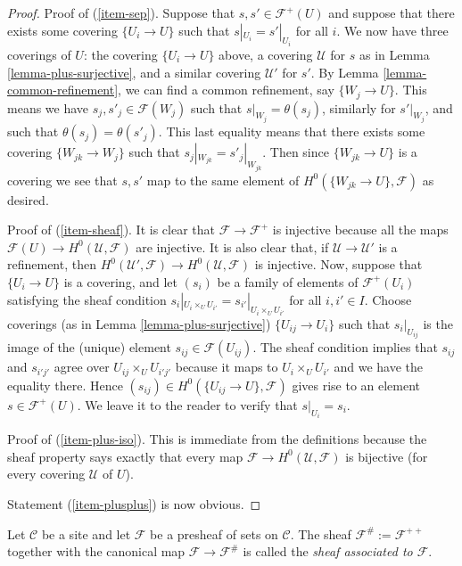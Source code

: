 \begin{proof}
Proof of (\ref{item-sep}).
Suppose that $s, s' \in \mathcal{F}^+(U)$ and suppose that
there exists some covering $\{U_i \to U\}$ such that
$s|_{U_i} = s'|_{U_i}$ for all $i$. We now have three coverings
of $U$: the covering $\{U_i \to U\}$ above, a covering $\mathcal{U}$
for $s$ as in Lemma \ref{lemma-plus-surjective},
and a similar covering $\mathcal{U}'$ for $s'$. By Lemma
\ref{lemma-common-refinement}, we can find a common refinement,
say $\{W_j \to U\}$. This means we have $s_j, s'_j \in \mathcal{F}(W_j)$
such that $s|_{W_j} = \theta(s_j)$, similarly for $s'|_{W_j}$, and
such that $\theta(s_j) = \theta(s'_j)$. This last equality means
that there exists some covering $\{W_{jk} \to W_j\}$ such that
$s_j|_{W_{jk}} = s'_j|_{W_{jk}}$. Then since $\{W_{jk} \to U\}$
is a covering we see that $s, s'$ map to the same element of
$H^0(\{W_{jk} \to U\}, \mathcal{F})$ as desired.

\medskip\noindent
Proof of (\ref{item-sheaf}). It is clear that $\mathcal{F} \to
\mathcal{F}^+$ is injective because all the maps
$\mathcal{F}(U) \to H^0(\mathcal{U}, \mathcal{F})$
are injective. It is also clear that, if $\mathcal{U} \to
\mathcal{U}'$ is a refinement, then $H^0(\mathcal{U}', \mathcal{F})
\to H^0(\mathcal{U}, \mathcal{F})$ is injective. Now,
suppose that $\{U_i \to U\}$ is a covering, and let
$(s_i)$ be a family of elements of $\mathcal{F}^+(U_i)$
satisfying the sheaf condition
$s_i|_{U_i \times_U U_{i'}} = s_{i'}|_{U_i \times_U U_{i'}}$
for all $i, i' \in I$. Choose coverings (as in
Lemma \ref{lemma-plus-surjective}) $\{U_{ij} \to U_i\}$
such that $s_i|_{U_{ij}}$ is the image of the (unique)
element $s_{ij} \in \mathcal{F}(U_{ij})$. The sheaf condition
implies that $s_{ij}$ and $s_{i'j'}$ agree over
$U_{ij} \times_U U_{i'j'}$ because it maps to
$U_i \times_U U_{i'}$ and we have the equality there.
Hence $(s_{ij}) \in H^0(\{U_{ij} \to U\}, \mathcal{F})$
gives rise to an element $s \in \mathcal{F}^+(U)$. We leave
it to the reader to verify that $s|_{U_i} = s_i$.

\medskip\noindent
Proof of (\ref{item-plus-iso}). This is immediate from the definitions
because the sheaf property says exactly that every map
$\mathcal{F} \to H^0(\mathcal{U}, \mathcal{F})$ is bijective
(for every covering $\mathcal{U}$ of $U$).

\medskip\noindent
Statement (\ref{item-plusplus}) is now obvious.
\end{proof}

\begin{definition}
\label{definition-associated-sheaf}
Let $\mathcal{C}$ be a site and let $\mathcal{F}$ be a presheaf
of sets on $\mathcal{C}$. The sheaf $\mathcal{F}^\# := \mathcal{F}^{++}$
together with the canonical map $\mathcal{F} \to \mathcal{F}^\#$
is called the {\it sheaf associated to $\mathcal{F}$}.
\end{definition}

